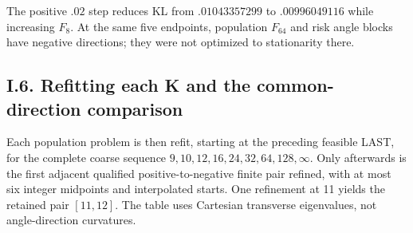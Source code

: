 \documentclass{article}
\begin{document}
The positive \(.02\) step reduces KL from \(.01043357299\) to
\(.00996049116\) while increasing \(F_8\). At the same five endpoints,
population \(F_{64}\) and risk angle blocks have negative directions;
they were not optimized to stationarity there.

\subsection*{I.6. Refitting each K and the common-direction
comparison}\label{i.6.-refitting-each-k-and-the-common-direction-comparison}

Each population problem is then refit, starting at the preceding
feasible LAST, for the complete coarse sequence
\(9,10,12,16,24,32,64,128,\infty\). Only afterwards is the first
adjacent qualified positive-to-negative finite pair refined, with at
most six integer midpoints and interpolated starts. One refinement at 11
yields the retained pair \([11,12]\). The table uses Cartesian
transverse eigenvalues, not angle-direction curvatures.
\end{document}
